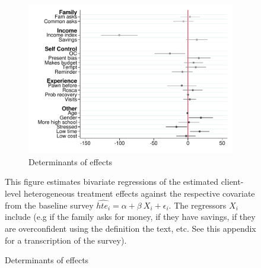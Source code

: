 \documentclass[oneside,11pt]{article}
\begin{document}
\begin{figure}[H]
    \caption{Heterogeneous Treatment Effect: Fee-forcing contract}
    \label{HTE_fee_forcing}
    \begin{center}
    \begin{subfigure}{0.7\textwidth}
        \caption{Determinants of effects}
        \centering
        \includegraphics[width=\textwidth]{Figuras/HE/he_int_vertical_fc_admin_disc_pro_2.pdf}
    \end{subfigure}
    
    \end{center}
     \scriptsize  This figure estimates bivariate regressions of the estimated client-level heterogeneous treatment effects against the respective covariate from the baseline survey  $\widehat{hte_i} = \alpha + \beta \: X_i + \epsilon_i$. The regressors $X_i$ include (e.g if the family asks for money, if they have savings, if they are overconfident using the definition the text, etc. See this appendix for a transcription of the survey).
\end{figure}
\end{document}
